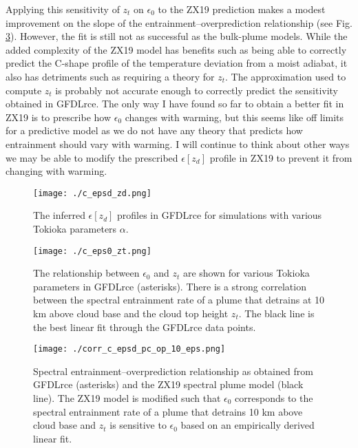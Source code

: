 \documentclass[11pt]{article}
\begin{document}
Applying this sensitivity of \(z_t\) on \(\epsilon_0\) to the ZX19 prediction makes a modest improvement on the slope of the entrainment--overprediction relationship (see Fig. \ref{fig:org506f3e2}). However, the fit is still not as successful as the bulk-plume models. While the added complexity of the ZX19 model has benefits such as being able to correctly predict the C-shape profile of the temperature deviation from a moist adiabat, it also has detriments such as requiring a theory for \(z_t\). The approximation used to compute \(z_t\) is probably not accurate enough to correctly predict the sensitivity obtained in GFDLrce. The only way I have found so far to obtain a better fit in ZX19 is to prescribe how \(\epsilon_0\) changes with warming, but this seems like off limits for a predictive model as we do not have any theory that predicts how entrainment should vary with warming. I will continue to think about other ways we may be able to modify the prescribed \(\epsilon[z_d]\) profile in ZX19 to prevent it from changing with warming.

\begin{figure}[htbp]
\centering
\texttt{[image: ./c\_epsd\_zd.png]}
\caption{\label{fig:org07325b1}The inferred \(\epsilon[z_d]\) profiles in GFDLrce for simulations with various Tokioka parameters \(\alpha\).}
\end{figure}

\begin{figure}[htbp]
\centering
\texttt{[image: ./c\_eps0\_zt.png]}
\caption{\label{fig:org0e86b61}The relationship between \(\epsilon_0\) and \(z_t\) are shown for various Tokioka parameters in GFDLrce (asterisks). There is a strong correlation between the spectral entrainment rate of a plume that detrains at 10 km above cloud base and the cloud top height \(z_t\). The black line is the best linear fit through the GFDLrce data points.}
\end{figure}

\begin{figure}[htbp]
\centering
\texttt{[image: ./corr\_c\_epsd\_pc\_op\_10\_eps.png]}
\caption{\label{fig:org506f3e2}Spectral entrainment--overprediction relationship as obtained from GFDLrce (asterisks) and the ZX19 spectral plume model (black line). The ZX19 model is modified such that \(\epsilon_0\) corresponds to the spectral entrainment rate of a plume that detrains 10 km above cloud base and \(z_t\) is sensitive to \(\epsilon_0\) based on an empirically derived linear fit.}
\end{figure}



\end{document}
